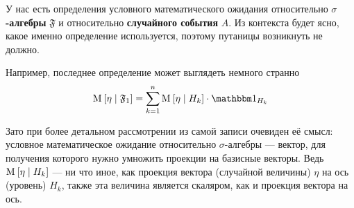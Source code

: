 \begin{remark}
    У нас есть определения условного математического ожидания
    относительно \textbf{$\sigma$-алгебры} $\mathfrak{F}$
    и относительно \textbf{случайного события} $A$.
    Из контекста будет ясно, какое именно определение используется,
    поэтому путаницы возникнуть не должно.

    Например, последнее определение может выглядеть немного странно
    $$\Mean{ \eta \mcond \mathfrak{F}_1 }
        = \sum_{k=1}^n \Mean{ \eta \mcond H_k }
            \cdot \indicatorof{H_k}$$

    Зато при более детальном рассмотрении из самой записи очевиден её смысл:
    условное математическое ожидание относительно $\sigma$-алгебры --- вектор,
    для получения которого нужно умножить проекции на базисные векторы.
    Ведь $\mathrm{M}_{} \left[  \eta \;\middle|\; H_k  \right]$ --- ни что иное, как проекция
    вектора (случайной величины) $\eta$ на ось (уровень) $H_k$,
    также эта величина является скаляром, как и проекция вектора на ось.
\end{remark}


